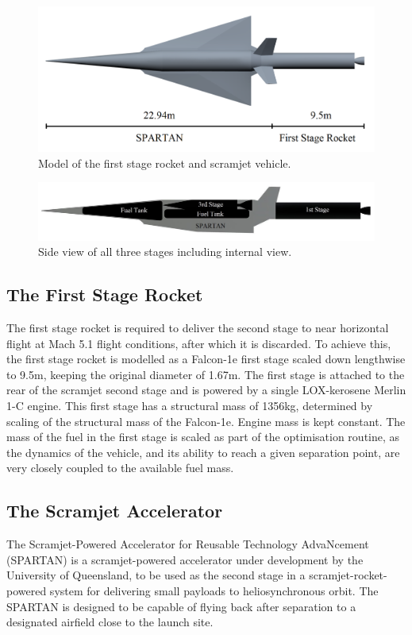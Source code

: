 \documentclass[journal]{new-aiaa}
\begin{document}
\begin{figure}[ht]
	\centering
	\includegraphics[width=.8\linewidth]{NoInternal}
	\caption{Model of the first stage rocket and scramjet vehicle.}
	\label{fig:NoInternal}
\end{figure}


\begin{figure}[ht]
	\centering
	\includegraphics[width=0.8\linewidth]{INTERNALS}
	\caption{Side view of all three stages including internal view.}
	\label{fig:INTERNALS}
\end{figure}

\subsection{The First Stage Rocket}




The first stage rocket is required to deliver the second stage to near horizontal flight at Mach 5.1 flight conditions, after which it is discarded. To achieve this, the first stage rocket is modelled as a Falcon-1e first stage scaled down lengthwise to 9.5m, keeping the original diameter of 1.67m\cite{Vehicle2008}. The first stage is attached to the rear of the scramjet second stage and is powered by a single LOX-kerosene Merlin 1-C engine.  This first stage has a structural mass of 1356kg, determined by scaling of the structural mass of the Falcon-1e. Engine mass is kept constant. The mass of the fuel in the first stage is scaled as part of the optimisation routine, as the dynamics of the vehicle, and its ability to reach a given separation point, are very closely coupled to the available fuel mass. 




\subsection{The Scramjet Accelerator}
The Scramjet-Powered Accelerator for Reusable Technology AdvaNcement (SPARTAN) is a scramjet-powered accelerator under development by the University of Queensland, to be used as the second stage in a scramjet-rocket-powered system for delivering small payloads to heliosynchronous orbit\cite{Preller2017}. The SPARTAN is designed to be capable of flying back after separation to a designated airfield close to the launch site.  
\end{document}
